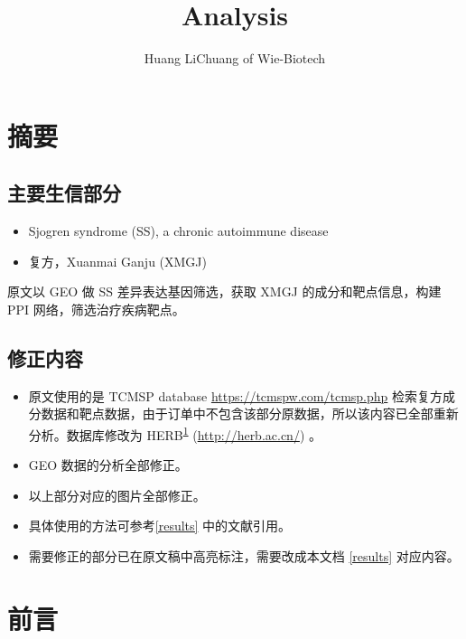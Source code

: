 \documentclass[
]{article}
\title{Analysis}
\author{Huang LiChuang of Wie-Biotech}
\date{}
\providecommand{\tightlist}{%
  \setlength{\itemsep}{0pt}\setlength{\parskip}{0pt}}
\begin{document}
\maketitle

{
\setcounter{tocdepth}{3}
\tableofcontents
}
\listoffigures

\listoftables

\hypertarget{abstract}{%
\section{摘要}\label{abstract}}

\hypertarget{ux4e3bux8981ux751fux4fe1ux90e8ux5206}{%
\subsection{主要生信部分}\label{ux4e3bux8981ux751fux4fe1ux90e8ux5206}}

\begin{itemize}
\tightlist
\item
  Sjogren syndrome (SS), a chronic autoimmune disease
\item
  复方，Xuanmai Ganju (XMGJ)
\end{itemize}

原文以 GEO 做 SS 差异表达基因筛选，获取 XMGJ 的成分和靶点信息，构建 PPI 网络，筛选治疗疾病靶点。

\hypertarget{ux4feeux6b63ux5185ux5bb9}{%
\subsection{修正内容}\label{ux4feeux6b63ux5185ux5bb9}}

\begin{itemize}
\tightlist
\item
  原文使用的是 TCMSP database \url{https://tcmspw.com/tcmsp.php} 检索复方成分数据和靶点数据，由于订单中不包含该部分原数据，所以该内容已全部重新分析。数据库修改为 HERB\textsuperscript{\protect\hyperlink{ref-HerbAHighThFang2021}{1}} (\url{http://herb.ac.cn/}) 。
\item
  GEO 数据的分析全部修正。
\item
  以上部分对应的图片全部修正。
\item
  具体使用的方法可参考\ref{results} 中的文献引用。
\item
  需要修正的部分已在原文稿中高亮标注，需要改成本文档 \ref{results} 对应内容。
\end{itemize}

\hypertarget{introduction}{%
\section{前言}\label{introduction}}
\end{document}
